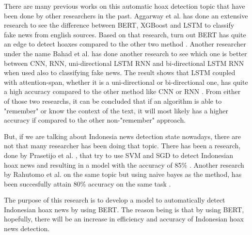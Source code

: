 There are many previous works on this automatic hoax detection topic that have been done by other researchers in the past. Aggarway et al. has done an extensive research to see the difference between BERT, XGBoost and LSTM to classify fake news from english sources. Based on that research, turn out BERT has quite an edge to detect hoaxes compared to the other two method \cite{bert_news_classi}. Another researcher under the name Bahad et al. has done another research to see which one is better between CNN, RNN, uni-directional LSTM RNN and bi-directional LSTM RNN when used also to classifying fake news. The result shows that LSTM coupled with attention-span, whether it is a uni-directional or bi-directional one, has quite a high accuracy compared to the other method like CNN or RNN \cite{bahad_lstm}. From either of those two researchs, it can be concluded that if an algorithm is able to "remember" or know the context of the text, it will most likely has a higher accuracy if compared to the other non-"remember" approach.

But, if we are talking about Indonesia news detection state nowadays, there are not that many researcher has been doing that topic. There has been a research, done by Prasetijo et al. , that try to use SVM and SGD to detect Indonesian hoax news and resulting in a model with the accuracy of 85\% \cite{prasetijo}. Another research by Rahutomo et al. on the same topic but using naive bayes as the method, has been succesfully attain 80\% accuracy on the same task \cite{rahutomo}.

The purpose of this research is to develop a model to automatically detect Indonesian hoax news by using BERT. The reason being is that by using BERT, hopefully, there will be an increase in efficiency and accuracy of Indonesian hoax news detection.

